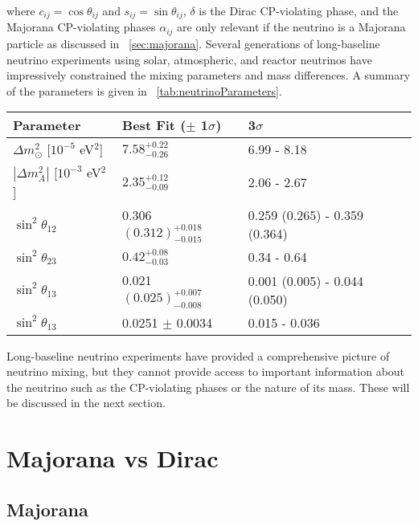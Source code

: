 where $c_{ij} = \cos{\theta_{ij}}$ and $s_{ij} = \sin{\theta_{ij}}$, $\delta$ is the Dirac CP-violating phase, and the Majorana CP-violating phases $\alpha_{ij}$ are only relevant if the neutrino is a Majorana particle as discussed in {\sect}~\ref{sec:majorana}.  Several generations of long-baseline neutrino experiments using solar, atmospheric, and reactor neutrinos have impressively constrained the mixing parameters and mass differences.  A summary of the parameters is given in {\tab}~\ref{tab:neutrinoParameters}.
\begin{table*}
\centering
\begin{tabular}{lll}\toprule
Parameter & Best Fit ($\pm$ 1$\sigma$) & 3$\sigma$ \\
\midrule
${\Delta}m^2_{\odot}$ [$10^{-5}$ eV$^2$] & $7.58^{+0.22}_{-0.26}$ & 6.99 - 8.18 \\
$|{\Delta}m^2_A|$ [$10^{-3}$ eV$^2$] & $2.35^{+0.12}_{-0.09}$ & 2.06 - 2.67 \\
$\sin^2{\theta_{12}}$ & 0.306 $(0.312)^{+0.018}_{-0.015}$ & 0.259 (0.265) - 0.359 (0.364) \\  
$\sin^2{\theta_{23}}$ & $0.42^{+0.08}_{-0.03}$ & 0.34 - 0.64 \\  
$\sin^2{\theta_{13}}$ & 0.021 $(0.025)^{+0.007}_{-0.008}$ & 0.001 (0.005) - 0.044 (0.050) \\   
$\sin^2{\theta_{13}}$ & 0.0251 $\pm$ 0.0034 & 0.015 - 0.036 \\
\bottomrule  
\end{tabular}
\caption{From PDG.}
\label{tab:neutrinoParameters}
\end{table*}
Long-baseline neutrino experiments have provided a comprehensive picture of neutrino mixing, but they cannot provide access to important information about the neutrino such as the CP-violating phases or the nature of its mass.  These will be discussed in the next section.


\section{Majorana vs Dirac}
\label{sec:mVd}
\begin{comment}
Discuss mechanisms by which neutrinos could get their mass.  
\end{comment}


\subsection{Majorana}
\begin{comment}
Discuss Majorana mechanism for mass
\end{comment}


